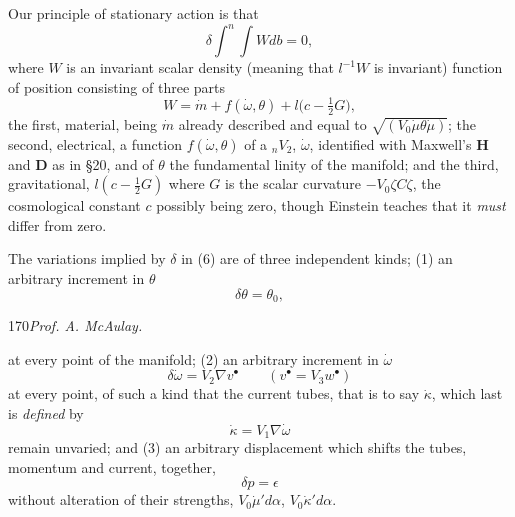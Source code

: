 \documentclass[11pt]{article}
\begin{document}
\indent Our principle of stationary action is that
\begin{equation}
  \delta\int^n\!\int Wdb=0,
  \tag{6}
\end{equation}
where $W$ is an invariant scalar density (meaning that $l^{-1}W$ is invariant) function of position consisting of three parts
\begin{equation}
  W=\dot m+f(\dot\omega,\theta)+l\bigl(c-\tfrac12G\bigr),
  \tag{7}
\end{equation}
the first, material, being $\dot m$ already described and equal to $\sqrt{(V_0\dot\mu\theta\dot\mu)}$; the second, electrical, a function $f(\dot\omega,\theta)$ of a ${}_nV_2$, $\dot\omega$, identified with Maxwell's $\mathbf{H}$ and $\mathbf{D}$ as in §20, and of $\theta$ the fundamental linity of the manifold; and the third, gravitational, $l(c-\tfrac12G)$ where $G$ is the scalar curvature $-V_0\zeta C\zeta$, the cosmological constant $c$ possibly being zero, though Einstein teaches that it \emph{must} differ from zero.

\indent The variations implied by $\delta$ in (6) are of three independent kinds; (1) an arbitrary increment in $\theta$
\begin{equation}
  \delta\theta=\theta_0,
  \tag{8}
\end{equation}

\newpage\thispagestyle{empty}\begin{center}170\hfill \textit{Prof. A. McAulay.}\end{center}
at every point of the manifold; (2) an arbitrary increment in $\dot\omega$
\begin{equation}
  \delta\dot\omega=V_2\nabla v^\bullet\qquad(v^\bullet=V_3w^\bullet)
  \tag{9}
\end{equation}
at every point, of such a kind that the current tubes, that is to say $\dot\kappa$, which last is \emph{defined} by
\begin{equation}
  \dot\kappa=V_1\nabla\dot\omega
  \tag{10}
\end{equation}
remain unvaried; and (3) an arbitrary displacement which shifts the tubes, momentum and current, together,
\begin{equation}
  \delta p=\epsilon
  \tag{11}
\end{equation}
without alteration of their strengths, $V_0\dot\mu'd\alpha$, $V_0\dot\kappa'd\alpha$.
\end{document}
